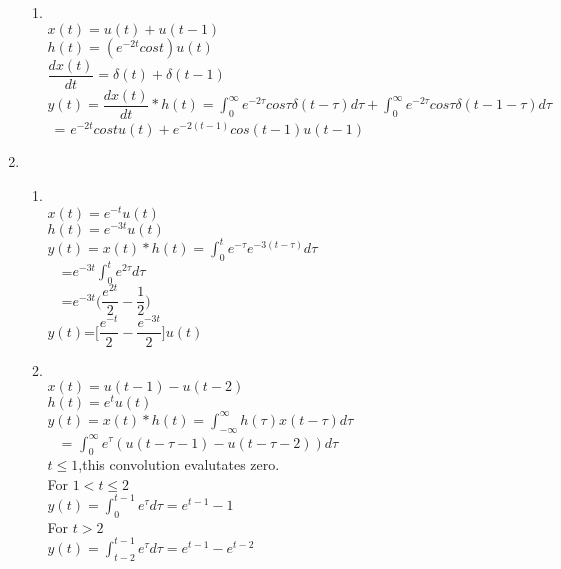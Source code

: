 \documentclass[10pt,a4paper, margin=1in]{article}
\begin{document}
\begin{enumerate}
\begin{enumerate}
		\item 
		\ \\
		$x(t)=u(t)+u(t-1)$\\
		$h(t)=(e^{-2t}cost )u(t)$\\
		$\dfrac{dx(t)}{dt}=\delta(t)+\delta(t-1)$\\
		$y(t)=\dfrac{dx(t)}{dt}*h(t)=\int_{0}^{\infty}e^{-2\tau}cos\tau \delta(t-\tau)d\tau + \int_{0}^{\infty}e^{-2\tau}cos\tau \delta(t-1-\tau)d\tau$\\
		\null \qquad \qquad \qquad \qquad \ = $e^{-2t}cost u(t) + e^{-2(t-1)}cos(t-1)u(t-1)$
	\end{enumerate}
\item  
\ \\
\begin{enumerate}
	\item %
	\ \\
	$x(t)=e^{-t}u(t)$\\
	$h(t)= e^{-3t}u(t)$\\
	
	$y(t)=x(t)*h(t)=\int_{0}^{t} e^{-\tau}e^{-3(t-\tau)}d\tau$\\
	\null \qquad \qquad \qquad \quad \ \ =$ e^{-3t}\int_{0}^{t}e^{2\tau}d\tau$\\
	\null \qquad \qquad \qquad \quad \ \ =$ e^{-3t}\Big(\dfrac{e^{2t}}{2}- \dfrac{1}{2}\Big) $\\
	$y(t)$=$\Big[\dfrac{e^{-t}}{2}-\dfrac{e^{-3t}}{2}\Big]u(t)$\\
	
	\item %
	\ \\
	$x(t)=u(t-1)-u(t-2)$\\
	$h(t)=e^tu(t)$\\
	
	$y(t)=x(t)*h(t)=\int_{-\infty}^{\infty}h(\tau)x(t-\tau)d\tau$\\
	\null \qquad \qquad \qquad \quad \ \ = $\int_{0}^{\infty}e^\tau(u(t-\tau-1)-u(t-\tau-2))d\tau$\\
	\null \qquad $t\le 1$,this convolution evalutates zero.\\
	For $1< t \le 2$\\
	\null \qquad \qquad $y(t)= \int_{0}^{t-1}e^\tau d\tau = e^{t-1}-1$\\
	For $t>2$\\
	\null \qquad \qquad $y(t) = \int_{t-2}^{t-1}e^\tau d\tau = e^{t-1}-e^{t-2}$\\
	

\end{enumerate}
\end{enumerate}
\end{document}
